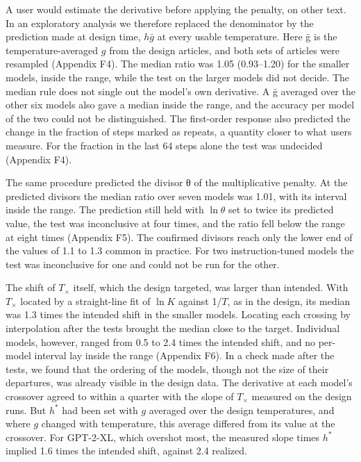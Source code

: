 \documentclass[aps,prx,onecolumn,superscriptaddress,longbibliography]{revtex4-2}
\begin{document}
A user would estimate the derivative before applying the penalty, on other text. In an exploratory analysis we therefore replaced the denominator by the prediction made at design time, \(h\bar{g}\) at every usable temperature. Here ḡ is the temperature-averaged \(g\) from the design articles, and both sets of articles were resampled (Appendix F4). The median ratio was 1.05 (0.93--1.20) for the smaller models, inside the range, while the test on the larger models did not decide. The median rule does not single out the model's own derivative. A ḡ averaged over the other six models also gave a median inside the range, and the accuracy per model of the two could not be distinguished. The first-order response also predicted the change in the fraction of steps marked as repeats, a quantity closer to what users measure. For the fraction in the last 64 steps alone the test was undecided (Appendix F4).

The same procedure predicted the divisor θ of the multiplicative penalty. At the predicted divisors the median ratio over seven models was 1.01, with its interval inside the range. The prediction still held with \(\ln \theta\) set to twice its predicted value, the test was inconclusive at four times, and the ratio fell below the range at eight times (Appendix F5). The confirmed divisors reach only the lower end of the values of 1.1 to 1.3 common in practice. For two instruction-tuned models the test was inconclusive for one and could not be run for the other.

The shift of \(T_{\times}\) itself, which the design targeted, was larger than intended. With \(T_{\times}\) located by a straight-line fit of \(\ln K\) against 1/\(T\), as in the design, its median was 1.3 times the intended shift in the smaller models. Locating each crossing by interpolation after the tests brought the median close to the target. Individual models, however, ranged from 0.5 to 2.4 times the intended shift, and no per-model interval lay inside the range (Appendix F6). In a check made after the tests, we found that the ordering of the models, though not the size of their departures, was already visible in the design data. The derivative at each model's crossover agreed to within a quarter with the slope of \(T_{\times}\) measured on the design runs. But \(h^*\) had been set with \(g\) averaged over the design temperatures, and where \(g\) changed with temperature, this average differed from its value at the crossover. For GPT-2-XL, which overshot most, the measured slope times \(h^*\) implied 1.6 times the intended shift, against 2.4 realized.
\end{document}
